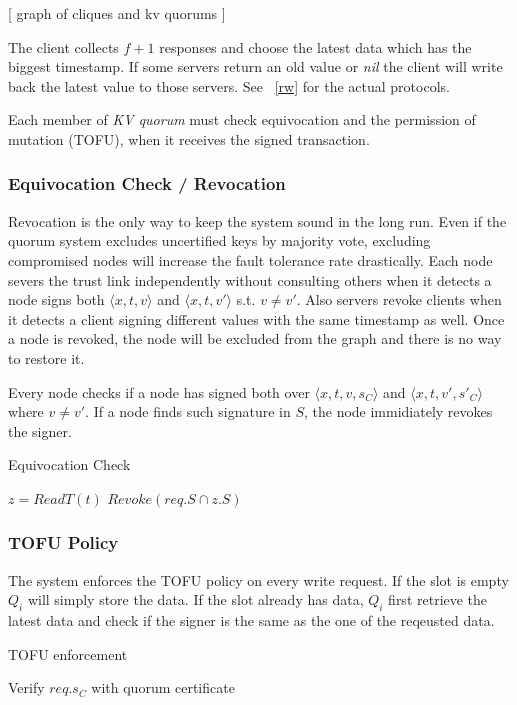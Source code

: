 [ graph of cliques and kv quorums ]

The client collects $f + 1$ responses and choose the latest data which
has the biggest timestamp. If some servers return an old value or {\em
  nil} the client will write back the latest value to those
servers. See ~\ref{rw} for the actual protocols.

Each member of {\em KV quorum} must check equivocation and the
permission of mutation (TOFU), when it receives the signed
transaction.

\subsubsection*{Equivocation Check / Revocation}
Revocation is the only way to keep the system sound in the long
run. Even if the quorum system excludes uncertified keys by majority
vote, excluding compromised nodes will increase the fault tolerance
rate drastically.
Each node severs the trust link independently without consulting
others when it detects a node signs both $\langle x,t,v \rangle$ and
$\langle x,t,v' \rangle$ s.t.  $v \neq v'$. Also servers revoke
clients when it detects a client signing different values with the
same timestamp as well. Once a node is revoked, the node will be
excluded from the graph and there is no way to restore it.

Every node checks if a node has signed both over $\langle x, t, v,
s_C \rangle$
and $\langle x, t, v', s'_C \rangle$ where $v \neq v'$. If a node
finds such signature in $S$, the node immidiately revokes the signer.
\begin{algorithm}
  \caption{Equivocation Check}
  \SetAlgoNoLine
  $z = ReadT(t)$\;
  {
    $Revoke(req.S \cap z.S)$\;
  }
\end{algorithm}

\subsubsection*{TOFU Policy}
The system enforces the TOFU policy on every write request. If the
slot is empty $Q_i$ will simply store the data. If the slot already
has data, $Q_i$ first retrieve the latest data and check if the
signer is the same as the one of the reqeusted data.
\begin{algorithm}
  \caption{TOFU enforcement}
  \SetAlgoNoLine
  Verify $req.s_C$ with quorum certificate\;
\end{algorithm}

